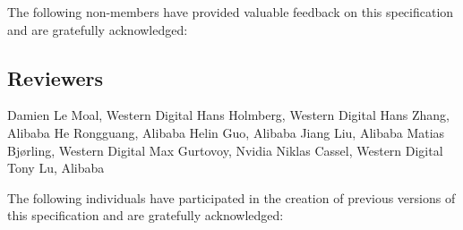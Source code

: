 The following non-members have provided valuable feedback on this
specification and are gratefully acknowledged:

\subsection*{Reviewers}
Damien Le Moal, Western Digital \newline
Hans Holmberg, Western Digital \newline
Hans Zhang, Alibaba \newline
He Rongguang, Alibaba \newline
Helin Guo, Alibaba \newline
Jiang Liu, Alibaba \newline
Matias Bjørling, Western Digital \newline
Max Gurtovoy, Nvidia \newline
Niklas Cassel, Western Digital \newline
Tony Lu, Alibaba \newline


The following individuals have participated in the creation of
previous versions of this specification and are gratefully acknowledged:

